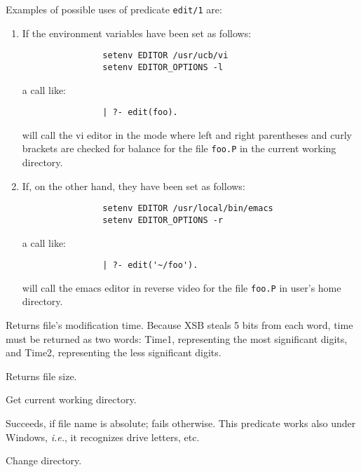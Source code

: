{    Examples of possible uses of predicate {\tt edit/1} are:
    \begin{enumerate}
    \item If the environment variables have been set as follows:
          \begin{verbatim}
                setenv EDITOR /usr/ucb/vi
                setenv EDITOR_OPTIONS -l
          \end{verbatim}
          a call like:
          \begin{verbatim}
                | ?- edit(foo).
          \end{verbatim}
          will call the vi editor in the mode where left and right parentheses
          and curly brackets are checked for balance for the file {\tt foo.P}
          in the current working directory.
    \item If, on the other hand, they have been set as follows:
          \begin{verbatim}
                setenv EDITOR /usr/local/bin/emacs
                setenv EDITOR_OPTIONS -r
          \end{verbatim}
          a call like:
          \begin{verbatim}
                | ?- edit('~/foo').
          \end{verbatim}	
          will call the emacs editor in reverse video for the file {\tt foo.P}
          in user's home directory.
    \end{enumerate}


Returns file's modification time. Because XSB steals 5 bits from each
word, time must be returned as two words: Time1, representing the most
significant digits, and Time2, representing the less significant
digits.


Returns file size.

Get current working directory.

 Succeeds, if file name is absolute; fails
otherwise.  This predicate works also under Windows, {\it
i.e.}, it recognizes drive letters, etc.

Change directory.

}
